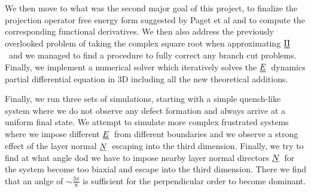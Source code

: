 \documentclass[12pt]{article}
\newcommand{\suf}[2]{\stackunder[0.5pt]{\stackunder[1pt]{\ensuremath{#1}}{\rule{\widthof{\ensuremath{#2}}*\real{0.9}}{.1ex}}}{}}
\newcommand{\duf}[2]{\stackunder[0.5pt]{\stackunder[0.8pt]{\stackunder[1pt]{\ensuremath{#1}}{\rule{\widthof{\ensuremath{#2}}*\real{0.9}}{.1ex}}}{\rule{\widthof{\ensuremath{#2}}*\real{0.9}}{.1ex}}}{}}
\newcommand{\su}[1]{\suf{#1}{#1}}
\newcommand{\du}[1]{\duf{#1}{#1}}
\newcommand{\NN}{\ensuremath{\su{N}}}
\newcommand{\EE}{\ensuremath{\du{E}}}
\newcommand{\PP}{\ensuremath{\du{\Pi}}}
\begin{document}
    We then move to what was the second major goal of this project, to finalize the projection operator free energy form suggested by Paget et al and to compute the corresponding functional derivatives.
    We then also address the previously overlooked problem of taking the complex square root when approximating \PP\ and we managed to find a procedure to fully correct any branch cut problems.
    Finally, we implement a numerical solver which iteratively solves the \EE\ dynamics partial differential equation in 3D including all the new theoretical additions.

    Finally, we run three sets of simulations, starting with a simple quench-like system where we do not observe any defect formation and always arrive at a uniform final state.
    We attempt to simulate more complex frustrated systems where we impose different \EE\ from different boundaries and we observe a strong effect of the layer normal \NN\ escaping into the third dimension.
    Finally, we try to find at what angle dod we have to impose nearby layer normal directors \NN\ for the system become too biaxial and escape into the third dimension.
    There we find that an anlge of ${\sim}\frac{3\pi}{8}$ is sufficient for the perpendicular order to become dominant.

\newpage
\printbibliography[heading=bibintoc]
\end{document}
